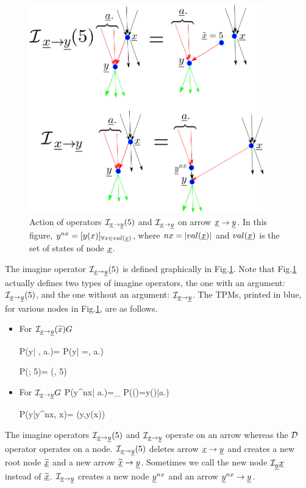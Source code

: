 \begin{figure}[h!]
\centering
\includegraphics[width=4in]
{counterf/kappa.png}
\caption{Action of  operators
$\cali_{\rvx\rarrow \rvy}(5)$
and $\cali_{\rvx\rarrow \rvy}$
on arrow $\rvx\rarrow \rvy$.
In this figure, $y^{nx}=[y(x)]_{\forall x\in val(\rvx)}$,
where $nx=|val(\rvx)|$
and $val(\rvx)$ is the set of states of node $\rvx$.
}
\label{fig-kappa}
\end{figure}

The imagine operator  $\cali_{\rvx\rarrow \rvy}(5)$
is defined graphically in Fig.\ref{fig-kappa}.
Note that Fig.\ref{fig-kappa}
actually defines two types
of imagine operators, the one
with an argument:
$\cali_{\rvx\rarrow \rvy}(5)$,
and the one without an argument:
$\cali_{\rvx\rarrow \rvy}$.
The TPMs, printed in blue,
for various nodes in
Fig.\ref{fig-kappa}, are as follows.



\begin{itemize}

\item
For $\cali_{\rvx\rarrow
\rvy}(\TIL{x})G$

\beq\color{blue}
P(y| , a.)=
P(y| \rvx=, a.)
\eeq

\beq\color{blue}
P(; 5)=
\delta(, 5)
\eeq

\item
For $\cali_{\rvx\rarrow \rvy}G$
\beq\color{blue}
P(y^{nx}| a.)=\prod_{}
P(\rvy()=y()|a.)
\eeq

\beq\color{blue}
P(y|y^{nx}, x)=
\delta(y,y(x))
\eeq
\end{itemize}
The imagine operators
$\cali_{\rvx\rarrow\rvy}(5)$
and $\cali_{\rvx\rarrow\rvy}$
operate on an arrow
whereas the
${\cal D}$ operator
 operates on a node.
$\cali_{\rvx\rarrow\rvy}(5)$
deletes
arrow $\rvx\rarrow\rvy$
and
creates a new root node
$\TIL{\rvx}$
and a new arrow
$\TIL{\rvx}\rarrow \rvy$.
Sometimes we call
the new node
$\cali_\rvy\rvx$
instead of
 $\TIL{\rvx}$.
$\cali_{\rvx\rarrow\rvy}$
creates
a new node $\rvy^{nx}$
and an arrow $\rvy^{nx}\rarrow \rvy$.



